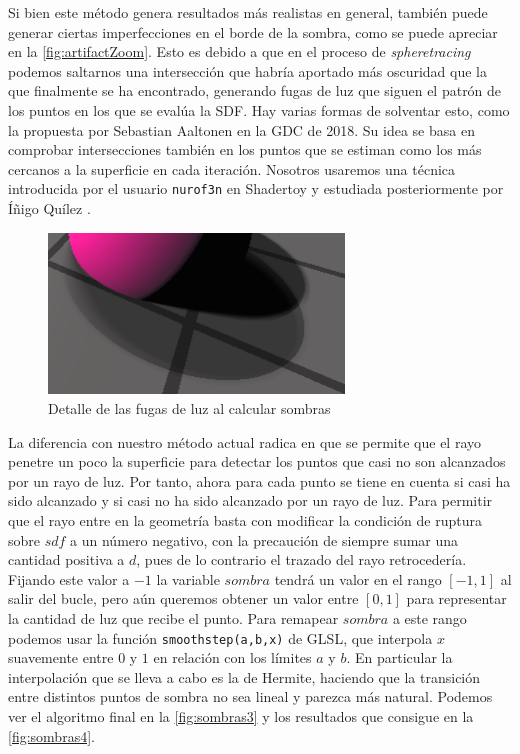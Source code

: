 Si bien este método genera resultados más realistas en general, también puede generar ciertas imperfecciones en el borde de la sombra, como se puede apreciar en la \autoref{fig:artifactZoom}. Esto es debido a que en el proceso de \textit{spheretracing} podemos saltarnos una intersección que habría aportado más oscuridad que la que finalmente se ha encontrado, generando fugas de luz que siguen el patrón de los puntos en los que se evalúa la SDF. Hay varias formas de solventar esto, como la propuesta por Sebastian Aaltonen \cite{claybook} en la GDC de 2018. Su idea se basa en comprobar intersecciones también en los puntos que se estiman como los más cercanos a la superficie en cada iteración. Nosotros usaremos una técnica introducida por el usuario \texttt{nurof3n} \cite{shadertoy-sombras} en Shadertoy y estudiada posteriormente por Íñigo Quílez \cite{article:shadow}.\newline

\begin{figure}[ht!]
    \centering
    \includegraphics[width=0.7\textwidth]{Plantilla-TFG-master/img/shadowArtifactZoom.png}
    \caption{Detalle de las fugas de luz al calcular sombras}
    \label{fig:artifactZoom}
\end{figure}

La diferencia con nuestro método actual radica en que se permite que el rayo penetre un poco la superficie para detectar los puntos que casi no son alcanzados por un rayo de luz. Por tanto, ahora para cada punto se tiene en cuenta si casi ha sido alcanzado y si casi no ha sido alcanzado por un rayo de luz. Para permitir que el rayo entre en la geometría basta con modificar la condición de ruptura sobre $sdf$ a un número negativo, con la precaución de siempre sumar una cantidad positiva a $d$, pues de lo contrario el trazado del rayo retrocedería. Fijando este valor a $-1$ la variable $sombra$ tendrá un valor en el rango $[-1,1]$ al salir del bucle, pero aún queremos obtener un valor entre $[0,1]$ para representar la cantidad de luz que recibe el punto. Para remapear $sombra$ a este rango podemos usar la función \texttt{smoothstep(a,b,x)} de GLSL, que interpola $x$ suavemente entre $0$ y $1$ en relación con los límites $a$ y $b$. En particular la interpolación que se lleva a cabo es la de Hermite, haciendo que la transición entre distintos puntos de sombra no sea lineal y parezca más natural. Podemos ver el algoritmo final en la \autoref{fig:sombras3} y los resultados que consigue en la \autoref{fig:sombras4}.

